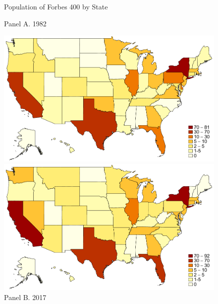 \documentclass[12pt]{article}
\begin{document}
\begin{figure}
	\centering
	\caption{Population of Forbes 400 by State}
	\label{fig:Stockmaps}
	\caption*{Panel A. 1982}
	\includegraphics[width=.9\textwidth]{../Figures/Figure2_a.pdf}
	\centering
	\caption*{Panel B. 2017}
	\includegraphics[width=.9\textwidth]{../Figures/Figure2_b.pdf}
\end{figure}
\vspace{10pt}
\clearpage
\end{document}
